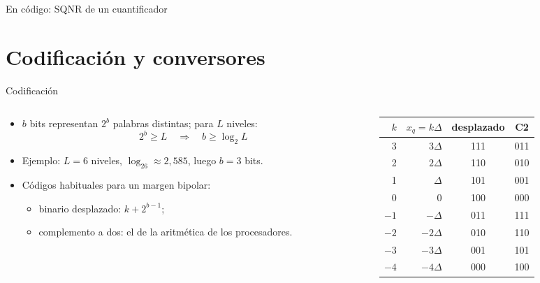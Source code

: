 \documentclass[aspectratio=169,11pt]{beamer}
\begin{document}
\begin{frame}{En código: SQNR de un cuantificador}
\end{frame}

\section{Codificación y conversores}

\begin{frame}{Codificación}
  \begin{columns}[c]
    \begin{column}{0.55\textwidth}
      \begin{itemize}
        \item $b$ bits representan $2^b$ palabras distintas; para $L$ niveles:
        \[
          2^b\ge L\quad\Longrightarrow\quad b\ge\log_2L
        \]
        \item \alert{Ejemplo}: $L=6$ niveles, $\log_26\approx2{,}585$, luego $b=3$ bits.
        \item Códigos habituales para un margen bipolar:
        \begin{itemize}\small
          \item \alert{binario desplazado}: $k+2^{b-1}$;
          \item \alert{complemento a dos}: el de la aritmética de los procesadores.
        \end{itemize}
      \end{itemize}
    \end{column}
    \begin{column}{0.42\textwidth}
      \footnotesize
      \renewcommand{\arraystretch}{1.1}
      \begin{tabular}{@{}rrcc@{}}
        \toprule
        $k$ & $x_q=k\Delta$ & desplazado & C2\\\midrule
        3 & $3\Delta$ & 111 & 011\\
        2 & $2\Delta$ & 110 & 010\\
        1 & $\Delta$ & 101 & 001\\
        0 & 0 & 100 & 000\\
        $-1$ & $-\Delta$ & 011 & 111\\
        $-2$ & $-2\Delta$ & 010 & 110\\
        $-3$ & $-3\Delta$ & 001 & 101\\
        $-4$ & $-4\Delta$ & 000 & 100\\\bottomrule
      \end{tabular}

      \gris{$b=3$, margen $[-4\Delta,4\Delta)$.}
    \end{column}
  \end{columns}
\end{frame}
\end{document}
